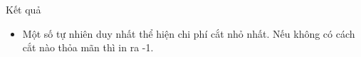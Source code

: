 Kết quả
\begin{itemize}
	\item Một số tự nhiên duy nhất thể hiện chi phí cắt nhỏ nhất. Nếu không có cách cắt nào thỏa mãn thì in ra -1.
\end{itemize}